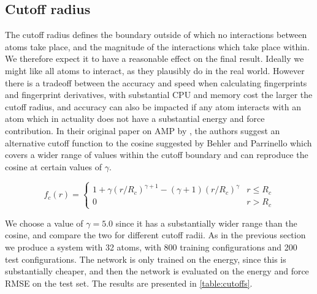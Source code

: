 \subsection{Cutoff radius}
The cutoff radius defines the boundary outside of which no interactions
between atoms take place, and the magnitude of the interactions
which take place within. We therefore expect it to have a reasonable
effect on the final result. Ideally we might like all atoms to interact,
as they plausibly do in the real world. However there is a tradeoff
between the accuracy and speed when calculating fingerprints and
fingerprint derivatives, with substantial CPU and memory cost the
larger the cutoff radius, and accuracy can also be impacted if any
atom interacts with an atom which in actuality does not have a substantial
energy and force contribution.
In their original paper on AMP by \parencite[Khorshidi and Peterson]{
khorshidi2016amp}, the authors suggest an alternative cutoff
function to the cosine suggested by Behler and Parrinello
which covers a wider range of values within the cutoff boundary
and can reproduce the cosine at certain values of $\gamma$.

\begin{equation}
    f_c(r) =
    \begin{cases}
        1 + \gamma (r / R_c)^{\gamma + 1} - (\gamma + 1)
        (r / R_c)^{\gamma} & r \leq R_c \\
        0 & r > R_c
    \end{cases}
\end{equation}

We choose a value of $\gamma = 5.0$ since it has a substantially wider
range than the cosine, and compare the two for different cutoff radii.
As in the previous section we produce a system with 32 atoms, with
800 training configurations and 200 test configurations. The network
is only trained on the energy, since this is substantially cheaper,
and then the network is evaluated on the energy and force RMSE
on the test set. The results are presented in \ref{table:cutoffs}.

